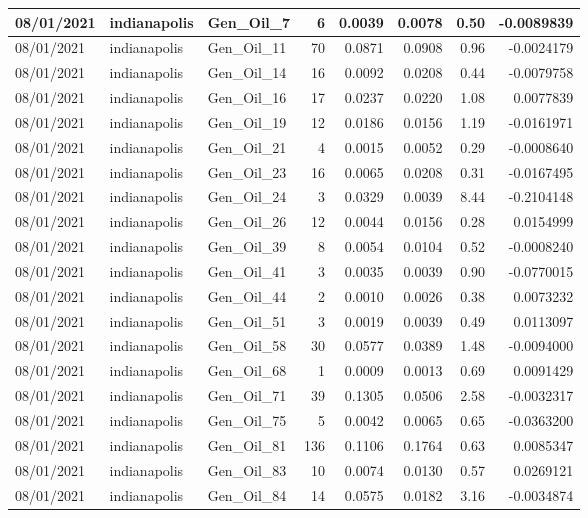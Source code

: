 \documentclass[
  letterpaper,
  DIV=11,
  numbers=noendperiod]{scrartcl}
\begin{document}
\begin{tabular}{l|l|l|r|r|r|r|r}
\hline
08/01/2021 & indianapolis & Gen\_Oil\_7 & 6 & 0.0039 & 0.0078 & 0.50 & -0.0089839\\
\hline
08/01/2021 & indianapolis & Gen\_Oil\_11 & 70 & 0.0871 & 0.0908 & 0.96 & -0.0024179\\
\hline
08/01/2021 & indianapolis & Gen\_Oil\_14 & 16 & 0.0092 & 0.0208 & 0.44 & -0.0079758\\
\hline
08/01/2021 & indianapolis & Gen\_Oil\_16 & 17 & 0.0237 & 0.0220 & 1.08 & 0.0077839\\
\hline
08/01/2021 & indianapolis & Gen\_Oil\_19 & 12 & 0.0186 & 0.0156 & 1.19 & -0.0161971\\
\hline
08/01/2021 & indianapolis & Gen\_Oil\_21 & 4 & 0.0015 & 0.0052 & 0.29 & -0.0008640\\
\hline
08/01/2021 & indianapolis & Gen\_Oil\_23 & 16 & 0.0065 & 0.0208 & 0.31 & -0.0167495\\
\hline
08/01/2021 & indianapolis & Gen\_Oil\_24 & 3 & 0.0329 & 0.0039 & 8.44 & -0.2104148\\
\hline
08/01/2021 & indianapolis & Gen\_Oil\_26 & 12 & 0.0044 & 0.0156 & 0.28 & 0.0154999\\
\hline
08/01/2021 & indianapolis & Gen\_Oil\_39 & 8 & 0.0054 & 0.0104 & 0.52 & -0.0008240\\
\hline
08/01/2021 & indianapolis & Gen\_Oil\_41 & 3 & 0.0035 & 0.0039 & 0.90 & -0.0770015\\
\hline
08/01/2021 & indianapolis & Gen\_Oil\_44 & 2 & 0.0010 & 0.0026 & 0.38 & 0.0073232\\
\hline
08/01/2021 & indianapolis & Gen\_Oil\_51 & 3 & 0.0019 & 0.0039 & 0.49 & 0.0113097\\
\hline
08/01/2021 & indianapolis & Gen\_Oil\_58 & 30 & 0.0577 & 0.0389 & 1.48 & -0.0094000\\
\hline
08/01/2021 & indianapolis & Gen\_Oil\_68 & 1 & 0.0009 & 0.0013 & 0.69 & 0.0091429\\
\hline
08/01/2021 & indianapolis & Gen\_Oil\_71 & 39 & 0.1305 & 0.0506 & 2.58 & -0.0032317\\
\hline
08/01/2021 & indianapolis & Gen\_Oil\_75 & 5 & 0.0042 & 0.0065 & 0.65 & -0.0363200\\
\hline
08/01/2021 & indianapolis & Gen\_Oil\_81 & 136 & 0.1106 & 0.1764 & 0.63 & 0.0085347\\
\hline
08/01/2021 & indianapolis & Gen\_Oil\_83 & 10 & 0.0074 & 0.0130 & 0.57 & 0.0269121\\
\hline
08/01/2021 & indianapolis & Gen\_Oil\_84 & 14 & 0.0575 & 0.0182 & 3.16 & -0.0034874\\

\end{tabular}
\end{document}
